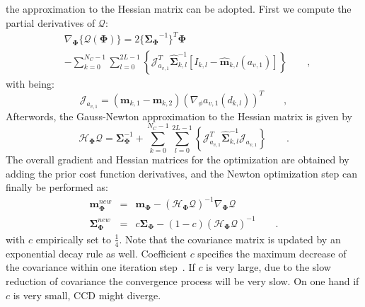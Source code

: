 \documentclass[conference]{IEEEtran}
\begin{document}
the approximation to the Hessian matrix can be adopted. First we
compute the partial derivatives of $\mathcal{Q}$:
\begin{equation}
\label{eq:partcost}
\begin{aligned}
&\nabla_{\mathbf{\Phi}}\{{\mathcal{Q}(\mathbf{\Phi})}\} =
2\{{\mathbf{\Sigma}_{\mathbf{\Phi}}}^{-1}\}^{T}{\mathbf{\Phi}}\\ 
&- \sum_{k = 0}^{N_{C}-1} \sum_{l=0}^{2L-1} \left\{\mathcal{J}_{a_{v,1}}^T\hat{\mathbf{\Sigma}}_{k,l}^{-1}\left[I_{k,l}-\hat{\mathbf{m}}_{k,l}(a_{v,1})\right]\right\}\qquad,
\end{aligned}
\end{equation}
with being:
\begin{equation}
  \label{eq:jocob}
  \mathcal{J}_{a_{v,1}} = \left( \mathbf{m}_{k,1} -\mathbf{m}_{k,2} \right)(\nabla_{\phi} a_{v,1}(d_{k,l}))^T\qquad,
\end{equation}
Afterwords, the Gauss-Newton approximation to the Hessian
matrix is given by
\begin{equation}
  \label{eq:hessian}
  \mathcal{H}_{\mathbf{\Phi}} \mathcal{Q}  =
  \mathbf{\Sigma}_{\mathbf{\Phi}}^{-1} + \sum_{k = 0}^{N_{C}-1}
  \sum_{l=0}^{2L-1} \left\{\mathcal{J}_{a_{v,1}}^T\hat{\mathbf{\Sigma}}_{k,l}^{-1}\mathcal{J}_{a_{v,1}}\right\}\qquad.
\end{equation}
The overall gradient and Hessian matrices for the optimization
are obtained by adding the prior cost function
derivatives, and the Newton optimization step can finally be
performed as:
\begin{eqnarray}
\label{eq:newton}
  \mathbf{m}_{\mathbf{\Phi}}^{new} & = &
  \mathbf{m}_{\mathbf{\Phi}} - (\mathcal{H}_{\mathbf{\Phi}}
  \mathcal{Q})^{-1} \nabla_{\mathbf{\Phi}} \mathcal{Q} \nonumber \\
  \mathbf{\Sigma}_{\mathbf{\Phi}}^{new} & = &
  c\mathbf{\Sigma}_{\mathbf{\Phi}} - (1-c)(\mathcal{H}_{\mathbf{\Phi}}
  \mathcal{Q})^{-1}\qquad.
\end{eqnarray}
with $c$ empirically set to $\frac{1}{4}$. Note that the covariance
matrix is updated by an exponential decay rule as well. Coefficient $c$ specifies the
maximum decrease of the covariance within one iteration
step~\cite{hanek2004contracting}. If $c$ is very large, due to the slow reduction of covariance the
convergence process will be very slow. On one hand if $c$ is
very small, CCD might diverge.


\end{document}
